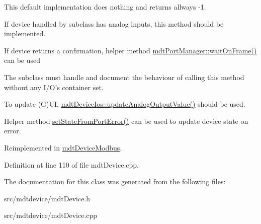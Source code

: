 \begin{DoxyItemize}
\item This default implementation does nothing and returns allways -\/1.
\item If device handled by subclass has analog inputs, this method should be implemented.
\item If device returns a confirmation, helper method \hyperlink{classmdt_port_manager_a1db6b8da9ff16221c917a1a75366e5c0}{mdtPortManager::waitOnFrame()} can be used
\item The subclass must handle and document the behaviour of calling this method without any I/O's container set.
\item To update (G)UI, \hyperlink{classmdt_device_ios_aaa6fbf435ddf8760487d962e1a6307f2}{mdtDeviceIos::updateAnalogOutputValue()} should be used.
\item Helper method \hyperlink{classmdt_device_ab77eb4c1bb50201e97a4dbd8b538659a}{setStateFromPortError()} can be used to update device state on error. 
\end{DoxyItemize}

Reimplemented in \hyperlink{classmdt_device_modbus_aa130270b477df290a3f4ea120200b79f}{mdtDeviceModbus}.



Definition at line 110 of file mdtDevice.cpp.



The documentation for this class was generated from the following files:\begin{DoxyCompactItemize}
\item 
src/mdtdevice/mdtDevice.h\item 
src/mdtdevice/mdtDevice.cpp\end{DoxyCompactItemize}

